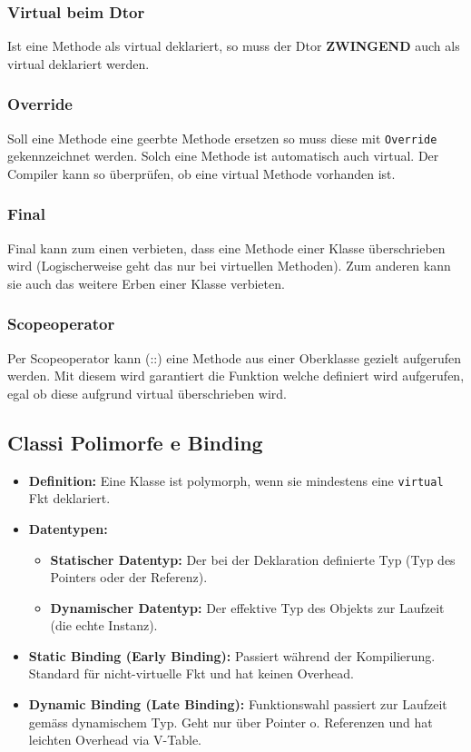 \subsubsection{Virtual beim Dtor}

Ist eine Methode als virtual deklariert, so muss der Dtor \textbf{ZWINGEND} auch als virtual deklariert werden.
\subsubsection{Override}

Soll eine Methode eine geerbte Methode ersetzen so muss diese mit \texttt{Override} gekennzeichnet werden. 
Solch eine Methode ist automatisch auch virtual.
Der Compiler kann so überprüfen, ob eine virtual Methode vorhanden ist.
\subsubsection{Final}

Final kann zum einen verbieten, dass eine Methode einer Klasse überschrieben wird
(Logischerweise geht das nur bei virtuellen Methoden). 
Zum anderen kann sie auch das weitere Erben einer Klasse verbieten.
\subsubsection{Scopeoperator}

Per Scopeoperator kann (::) eine Methode aus einer Oberklasse gezielt aufgerufen werden. 
Mit diesem wird garantiert die Funktion welche definiert wird aufgerufen, egal ob diese aufgrund virtual überschrieben wird. 

\subsection{Classi Polimorfe e Binding}

\begin{itemize}
    \item \textbf{Definition:} Eine Klasse ist polymorph, wenn sie mindestens eine \lstinline|virtual| Fkt deklariert.
    \item \textbf{Datentypen:}
    \begin{itemize}
        \item \textbf{Statischer Datentyp:} Der bei der Deklaration definierte Typ (Typ des Pointers oder der Referenz).
        \item \textbf{Dynamischer Datentyp:} Der effektive Typ des Objekts zur Laufzeit (die echte Instanz).
    \end{itemize}
    \item \textbf{Static Binding (Early Binding):} Passiert während der Kompilierung. Standard für nicht-virtuelle Fkt und hat keinen Overhead.
    \item \textbf{Dynamic Binding (Late Binding):} Funktionswahl passiert zur Laufzeit gemäss dynamischem Typ. Geht nur über Pointer o. Referenzen und hat leichten Overhead via V-Table.
\end{itemize}

